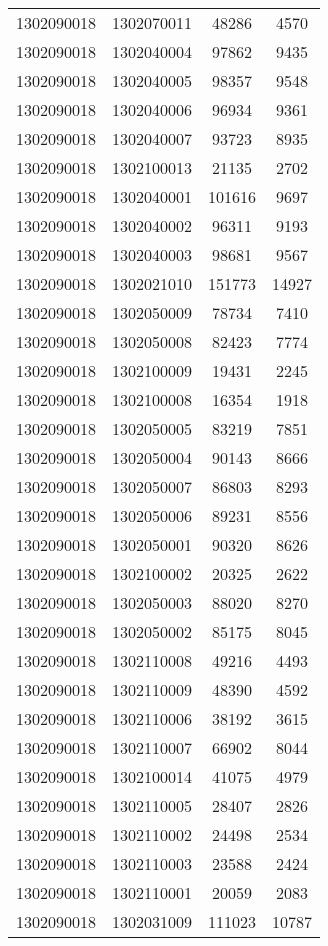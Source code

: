 \begin{longtable}[h]{llcc}
		1302090018 & 1302070011 & 48286 & 4570\\
		1302090018 & 1302040004 & 97862 & 9435\\
		1302090018 & 1302040005 & 98357 & 9548\\
		1302090018 & 1302040006 & 96934 & 9361\\
		1302090018 & 1302040007 & 93723 & 8935\\
		1302090018 & 1302100013 & 21135 & 2702\\
		1302090018 & 1302040001 & 101616 & 9697\\
		1302090018 & 1302040002 & 96311 & 9193\\
		1302090018 & 1302040003 & 98681 & 9567\\
		1302090018 & 1302021010 & 151773 & 14927\\
		1302090018 & 1302050009 & 78734 & 7410\\
		1302090018 & 1302050008 & 82423 & 7774\\
		1302090018 & 1302100009 & 19431 & 2245\\
		1302090018 & 1302100008 & 16354 & 1918\\
		1302090018 & 1302050005 & 83219 & 7851\\
		1302090018 & 1302050004 & 90143 & 8666\\
		1302090018 & 1302050007 & 86803 & 8293\\
		1302090018 & 1302050006 & 89231 & 8556\\
		1302090018 & 1302050001 & 90320 & 8626\\
		1302090018 & 1302100002 & 20325 & 2622\\
		1302090018 & 1302050003 & 88020 & 8270\\
		1302090018 & 1302050002 & 85175 & 8045\\
		1302090018 & 1302110008 & 49216 & 4493\\
		1302090018 & 1302110009 & 48390 & 4592\\
		1302090018 & 1302110006 & 38192 & 3615\\
		1302090018 & 1302110007 & 66902 & 8044\\
		1302090018 & 1302100014 & 41075 & 4979\\
		1302090018 & 1302110005 & 28407 & 2826\\
		1302090018 & 1302110002 & 24498 & 2534\\
		1302090018 & 1302110003 & 23588 & 2424\\
		1302090018 & 1302110001 & 20059 & 2083\\
		1302090018 & 1302031009 & 111023 & 10787\\

\end{longtable}
